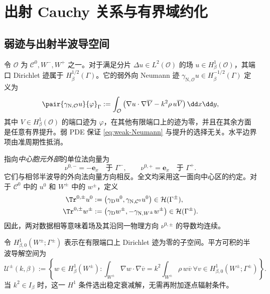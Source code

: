 \section{出射 Cauchy 关系与有界域约化}
\label{sec:cauchy-reduction}

\subsection{弱迹与出射半波导空间}

令 $\mathcal O$ 为 $\mathcal C^0,W^-,W^+$ 之一。对于满足分片 $\Delta u\in L^2(\mathcal O)$ 的场 $u\in H^1_\beta(\mathcal O)$，其端口 Dirichlet 迹属于 $H^{1/2}_\beta(\Gamma)$。它的弱外向 Neumann 迹 $\gamma_{\mathrm N,\mathcal O}u\in H^{-1/2}_\beta(\Gamma)$ 定义为
\begin{equation}
  \pair{\gamma_{\mathrm N,\mathcal O}u}{\varphi}_{\Gamma}
  :=\int_{\mathcal O}\left(\nabla u\cdot\nabla\overline V-k^2\rho\,u\overline V\right)
  \dd x\dd y,
  \label{eq:weak-Neumann}
\end{equation}
其中 $V\in H^1_\beta(\mathcal O)$ 的端口迹为 $\varphi$，在其他有限端口上的迹为零，并且在其余方面是任意有界提升。弱 PDE 保证 \eqref{eq:weak-Neumann} 与提升的选择无关。水平边界项由准周期性抵消。

指向\emph{中心胞元外部}的单位法向量为
\[
  \nu^{0,-}=-\mathbf e_x\quad\text{于 }\Gamma^- ,\qquad
  \nu^{0,+}=\mathbf e_x\quad\text{于 }\Gamma^+.
\]
它们与相邻半波导的外向法向量方向相反。全文均采用这一面向中心区的约定。对于 $\mathcal C^0$ 中的 $u^0$ 和 $W^\pm$ 中的 $w^\pm$，定义
\begin{align}
  \Tr^{0,\pm} u^0
  &:=\bigl(\gamma_{\mathrm D}u^0,\gamma_{\mathrm N,\mathcal C^0}u^0\bigr)
  \in\mathcal H(\Gamma^\pm),\label{eq:center-trace}\\
  \Tr^{0,\pm} w^\pm
  &:=\bigl(\gamma_{\mathrm D}w^\pm,-\gamma_{\mathrm N,W^\pm}w^\pm\bigr)
  \in\mathcal H(\Gamma^\pm).
  \label{eq:halfguide-trace}
\end{align}
因此，两对数据相等意味着场及其沿同一物理方向 $\nu^{0,\pm}$ 的导数均连续。

令 $H^1_{\beta,0}(W^\pm;\Gamma^\pm)$ 表示在有限端口上 Dirichlet 迹为零的子空间。平方可积的半波导解空间为
\begin{equation}
  \mathcal U^\pm(k,\beta):=
  \left\{w\in H^1_\beta(W^\pm):
  \int_{W^\pm}\nabla w\cdot\nabla\overline v
  =k^2\int_{W^\pm}\rho\,w\overline v
  \ \forall v\in H^1_{\beta,0}(W^\pm;\Gamma^\pm)\right\}.
  \label{eq:halfguide-outgoing}
\end{equation}
当 $k^2\in I_\beta$ 时，这一 $H^1$ 条件选出稳定衰减解，无需再附加逐点辐射条件。


